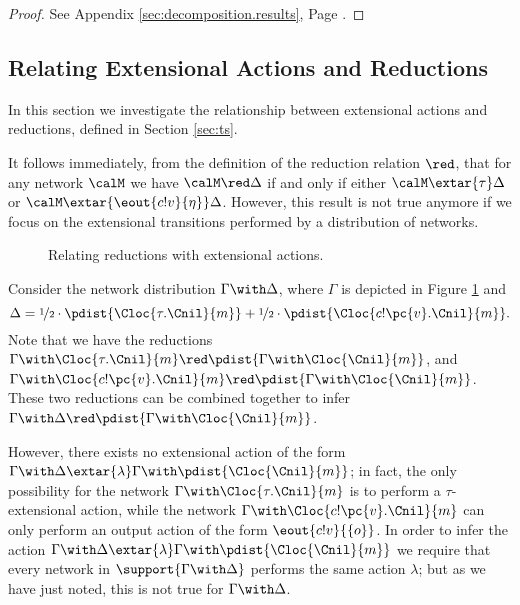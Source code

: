 \documentclass{LMCS}
\begin{document}
\begin{proof}
  See Appendix \ref{sec:decomposition.results}, Page \pageref{proof:composition}.
\end{proof}



\subsection{Relating Extensional Actions and Reductions}
\label{sec:relating}
In this section we investigate the relationship between 
extensional actions and reductions, defined in Section 
\ref{sec:ts}. 

It follows immediately, from the definition of the 
reduction relation $\red$, that for any 
network $\calM$ we have $\calM \red \Delta$ 
if and only if either $\calM \extar{\tau} \Delta$ 
or $\calM \extar{\eout{c!v}{\eta}} \Delta$. 
However, this result is not true anymore if we 
focus on the extensional transitions performed 
by a distribution of networks. 
\begin{figure}
\begin{center}
\end{center}
\caption{Relating reductions with extensional actions.}
\label{fig:red.ext}
\end{figure}

\begin{exa} 
\label{ex:red.ext}
Consider the network distribution $\Gamma \with \Delta$, 
where $\Gamma$ is depicted in Figure \ref{fig:red.ext} and 
\[
\Delta = \nicefrac{1}{2} \cdot \pdist{\Cloc{\tau.\Cnil}{m}} + 
\nicefrac{1}{2} \cdot \pdist{\Cloc{c!\pc{v}.\Cnil}{m}}.
\]
\noindent
Note that we have the reductions $\Gamma \with \Cloc{\tau.\Cnil}{m} 
\red \pdist{\Gamma \with \Cloc{\Cnil}{m}}$, and 
$\Gamma \with \Cloc{c!\pc{v}.\Cnil}{m} \red 
\pdist{\Gamma \with \Cloc{\Cnil}{m}}$. These two 
reductions can be combined together to infer  
$\Gamma \with \Delta \red \pdist{\Gamma \with \Cloc{\Cnil}{m}}$.

However, there exists no extensional action of the form $\Gamma \with \Delta 
\extar{\lambda} \Gamma \with \pdist{\Cloc{\Cnil}{m}}$; in fact, 
the only possibility for the network $\Gamma \with \Cloc{\tau.\Cnil}{m}$ is 
to perform a $\tau$-extensional action, while the network $\Gamma \with 
\Cloc{c!\pc{v}.\Cnil}{m}$ can only perform an output action of 
the form $\eout{c!v}{\{o\}}$. In order to infer the action 
$\Gamma \with \Delta \extar{\lambda} \Gamma \with \pdist{\Cloc{\Cnil}{m}}$ 
we require that every network in $\support{\Gamma \with \Delta}$ 
performs the same action $\lambda$; but as we have just noted, 
this is not true for $\Gamma \with \Delta$.
\end{exa}
\end{document}

